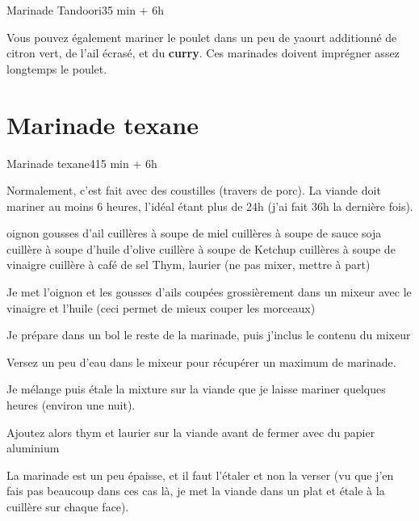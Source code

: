 {\begin{recette}{Marinade Tandoori}{3}{5 min + 6h}{}
\begin{remarque}
Vous pouvez également mariner le poulet dans un peu de yaourt additionné de citron vert, de l'ail écrasé, et du \textbf{curry}. 
Ces marinades doivent imprégner assez longtemps le poulet.
\end{remarque}

\end{recette}

\section{Marinade texane}\label{sec:travers_texane}
\begin{recette}{Marinade texane}{4}{15 min + 6h}{}
\begin{remarque}
Normalement, c'est fait avec des coustilles (travers de porc). La viande doit mariner au moins 6 heures, l'idéal étant plus de 24h (j'ai fait 36h la dernière fois).
\end{remarque}
\begin{ingredients}
 oignon
 gousses d'ail
 cuillères à soupe de miel
 cuillères à soupe de sauce soja
 cuillère à soupe d'huile d'olive
 cuillère à soupe de Ketchup
 cuillères à soupe de vinaigre
 cuillère à café de sel
\ingredient Thym, laurier (ne pas mixer, mettre à part)
\end{ingredients}

\begin{preparation}
\item Je met l'oignon et les gousses d'ails coupées grossièrement dans un mixeur avec le vinaigre et l'huile (ceci permet de 
mieux couper les morceaux)
\item Je prépare dans un bol le reste de la marinade, puis j'inclus le contenu du mixeur
\item Versez un peu d'eau dans le mixeur pour récupérer un maximum de marinade.
\item Je mélange puis étale la mixture sur la viande que je laisse mariner quelques heures (environ une nuit).
\item Ajoutez alors thym et laurier sur la viande avant de fermer avec du papier aluminium
\end{preparation}

\begin{remarque}
La marinade est un peu épaisse, et il faut l'étaler et non la verser (vu que j'en fais pas beaucoup dans ces cas là, je met la 
viande dans un plat et étale à la cuillère sur chaque face).
\end{remarque}
\end{recette}


}%
